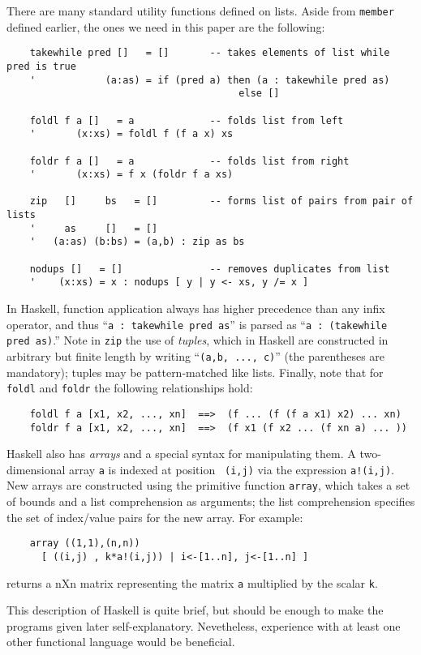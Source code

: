 There are many standard utility functions defined on lists.  Aside
from {\tt member} defined earlier, the ones we need in this paper are
the following:
\begin{verbatim}
    takewhile pred []   = []       -- takes elements of list while pred is true
    '            (a:as) = if (pred a) then (a : takewhile pred as)
                                        else []

    foldl f a []   = a             -- folds list from left
    '       (x:xs) = foldl f (f a x) xs

    foldr f a []   = a             -- folds list from right
    '       (x:xs) = f x (foldr f a xs)

    zip   []     bs   = []         -- forms list of pairs from pair of lists
    '     as     []   = []
    '   (a:as) (b:bs) = (a,b) : zip as bs

    nodups []   = []               -- removes duplicates from list
    '    (x:xs) = x : nodups [ y | y <- xs, y /= x ]
\end{verbatim}
In Haskell, function application always has higher precedence than any
infix operator, and thus ``{\tt a : takewhile pred as}'' is parsed as
``{\tt a : (takewhile pred as)}.''  Note in {\tt zip} the use of {\em
tuples}, which in Haskell are constructed in arbitrary but finite
length by writing ``{\tt (a,b, ..., c)}'' (the parentheses are
mandatory); tuples may be pattern-matched like lists.  Finally, note
that for {\tt foldl} and {\tt foldr} the following relationships hold:
\begin{verbatim}
    foldl f a [x1, x2, ..., xn]  ==>  (f ... (f (f a x1) x2) ... xn)
    foldr f a [x1, x2, ..., xn]  ==>  (f x1 (f x2 ... (f xn a) ... ))
\end{verbatim}

Haskell also has {\em arrays} and a special syntax for manipulating
them.  A two-dimensional array {\tt a} is indexed at position {\tt
(i,j)} via the expression {\tt a!(i,j)}.  New arrays are constructed
using the primitive function {\tt array}, which takes a set of bounds
and a list comprehension as arguments; the list comprehension
specifies the set of index/value pairs for the new array.  For
example:
\begin{verbatim}
    array ((1,1),(n,n))
      [ ((i,j) , k*a!(i,j)) | i<-[1..n], j<-[1..n] ]
\end{verbatim}
returns a nXn matrix representing the matrix {\tt a} multiplied by the
scalar {\tt k}.

This description of Haskell is quite brief, but should be enough
to make the programs given later self-explanatory.  Nevetheless,
experience with at least one other functional language would be
beneficial.

